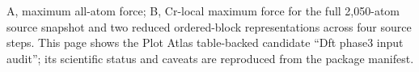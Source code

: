 A, maximum all-atom force; B, Cr-local maximum force for the full 2,050-atom source snapshot and two reduced ordered-block representations across four source steps. This page shows the Plot Atlas table-backed candidate ``Dft phase3 input audit''; its scientific status and caveats are reproduced from the package manifest.
